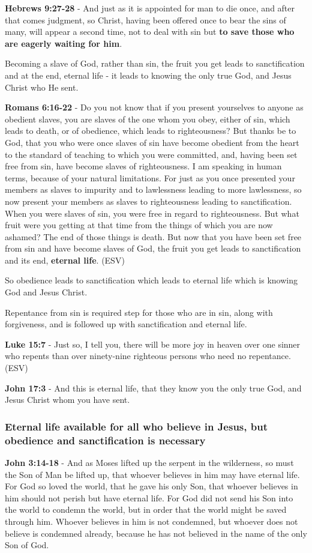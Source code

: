 \documentclass[11pt]{article}
\begin{document}
\textbf{Hebrews 9:27-28} - And just as it is appointed for man to die once, and after that comes judgment, so Christ, having been offered once to bear the sins of many, will appear a second time, not to deal with sin but \textbf{to save those who are eagerly waiting for him}.

Becoming a slave of God, rather than sin, the fruit you get leads to sanctification and at the end, eternal life - it leads to knowing the only true God, and Jesus Christ who He sent.

\textbf{Romans 6:16-22} - Do you not know that if you present yourselves to anyone as obedient slaves, you are slaves of the one whom you obey, either of sin, which leads to death, or of obedience, which leads to righteousness? But thanks be to God, that you who were once slaves of sin have become obedient from the heart to the standard of teaching to which you were committed, and, having been set free from sin, have become slaves of righteousness. I am speaking in human terms, because of your natural limitations. For just as you once presented your members as slaves to impurity and to lawlessness leading to more lawlessness, so now present your members as slaves to righteousness leading to sanctification. When you were slaves of sin, you were free in regard to righteousness. But what fruit were you getting at that time from the things of which you are now ashamed? The end of those things is death. But now that you have been set free from sin and have become slaves of God, the fruit you get leads to sanctification and its end, \textbf{eternal life}. (ESV)

So obedience leads to sanctification which leads to eternal life which is knowing God and Jesus Christ.

Repentance from sin is required step for those who are in sin, along with forgiveness, and is followed up with sanctification and eternal life.

\textbf{Luke 15:7} - Just so, I tell you, there will be more joy in heaven over one sinner who repents than over ninety-nine righteous persons who need no repentance. (ESV)

\textbf{John 17:3} - And this is eternal life, that they know you the only true God, and Jesus Christ whom you have sent.

\subsubsection{Eternal life \textbf{available} for all who believe in Jesus, but obedience and sanctification is necessary}
\label{sec:orgae4d75e}
\textbf{John 3:14-18} - And as Moses lifted up the serpent in the wilderness, so must the Son of Man be lifted up, that whoever believes in him may have eternal life. For God so loved the world, that he gave his only Son, that whoever believes in him should not perish but have eternal life. For God did not send his Son into the world to condemn the world, but in order that the world might be saved through him. Whoever believes in him is not condemned, but whoever does not believe is condemned already, because he has not believed in the name of the only Son of God.
\end{document}
